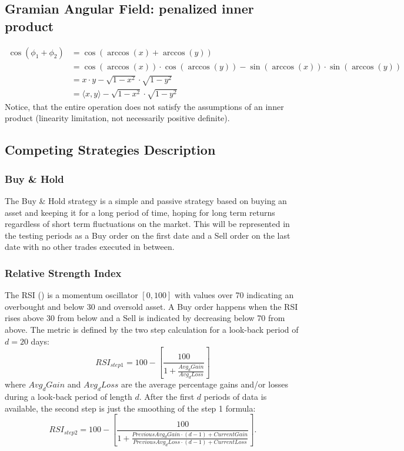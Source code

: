 \documentclass[11pt, a4paper]{article}
\begin{document}
\subsection{Gramian Angular Field: penalized inner product}
\label{app:GAF}
\begin{equation}
    \begin{split}
        \cos(\phi_1 + \phi_2)  & = \cos(\arccos(x) + \arccos(y)) \\
        & = \cos(\arccos(x)) \cdot \cos(\arccos(y)) - \sin(\arccos(x)) \cdot \sin(\arccos(y))\\
        & = x\cdot y - \sqrt{1-x^2} \cdot \sqrt{1-y^2}\\
        & = \langle x, y \rangle - \sqrt{1-x^2} \cdot \sqrt{1-y^2}
    \end{split}
\end{equation}
 Notice, that the entire operation does not satisfy the assumptions of an inner product (linearity limitation, not necessarily positive definite).

\subsection{Competing Strategies Description}
\label{app:CompetingStrats}

\subsubsection{Buy \& Hold}
The Buy \& Hold strategy is a simple and passive strategy based on buying an asset and keeping it for a long period of time, hoping for long term returns regardless of short term fluctuations on the market.
This will be represented in the testing periods as a Buy order on the first date and a Sell order on the last date with no other trades executed in between.

\subsubsection{Relative Strength Index}
The RSI (\cite{wilder1986relative}) is a momentum oscillator $[0, 100]$ with values over 70 indicating an overbought and below 30 and oversold asset. A Buy order happens when the RSI rises above 30 from below and a Sell is indicated by decreasing below 70 from above. The metric is defined by the two step calculation for a look-back period of $d=20$ days:
\begin{equation}
    \label{eq:RSI1}
    RSI_{step1} = 100 - \left[ \frac{100}{1 + \frac{Avg_d Gain}{Avg_d Loss}}\right]
\end{equation}
where $Avg_d Gain$ and $Avg_d Loss$ are the average percentage gains and/or losses during a look-back period of length $d$. After the first $d$ periods of data is available, the second step is just the smoothing of the step 1 formula:
\begin{equation}
    \label{eq:RSI2}
    RSI_{step2} = 100 - \left[ \frac{100}{1 + \frac{Previous Avg_d Gain \cdot (d-1) + Current Gain}{Previous Avg_d Loss \cdot (d-1) + Current Loss}}\right].
\end{equation}
\end{document}
